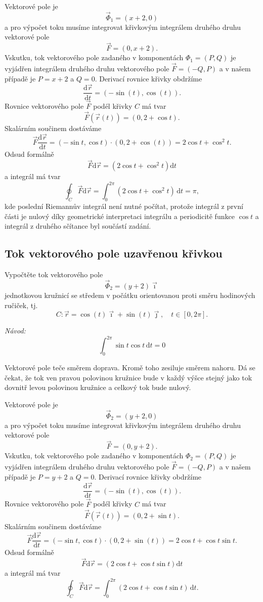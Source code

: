 Vektorové pole je $$\vec \Phi_1=(x+2,0)$$ a pro výpočet toku musíme integrovat křivkovým integrálem druhého druhu vektorové pole $$\vec F=(0,x+2).$$
Vskutku, tok vektorového pole zadaného v komponentách $\Phi_1=(P,Q)$ je vyjádřen integrálem druhého druhu vektorového pole $\vec F=(-Q,P)$ a v našem případě je $P=x+2$ a $Q=0$. Derivací rovnice křivky obdržíme
$$\frac{\mathrm d\vec r}{\mathrm dt}=(-\sin (t),\cos (t)).$$
Rovnice vektorového pole $\vec F$ podél křivky $C$ má tvar
$$\vec F(\vec r(t))=(0,2+\cos t).$$
Skalárním součinem dostáváme
$$\vec F \frac{\mathrm d\vec r}{\mathrm dt}=
(-\sin t,\cos t)\cdot (0,2+\cos (t)) = 2\cos t+\cos^2 t .
$$
Odsud formálně $$\vec F\mathrm d\vec r=(2\cos t+\cos^2 t)\mathrm dt$$
a integrál má tvar
$$\oint_C\vec F\mathrm d\vec r=\int_0^{2\pi }(2\cos t+\cos^2 t)\,\mathrm dt= \pi ,$$
kde poslední Riemannův integrál není nutné počítat, protože integrál z první části je nulový díky geometrické interpretaci integrálu a periodicitě funkce $\cos t$ a integrál z druhého sčítance byl součástí zadání.


\konec

\stranka



\subsection{Tok vektorového pole uzavřenou křivkou}

Vypočtěte tok vektorového pole $$\vec \Phi_2=(y+2)\vec\imath$$ jednotkovou kružnicí se středem v počátku orientovanou proti směru hodinových ručiček, tj. $$C\colon \vec r=\cos(t)\vec \imath+\sin(t)\vec\jmath, \quad t\in[0,2\pi].$$


\textit{Návod:} $$\int_0^{2\pi}\sin t\cos t\,\mathrm dt=0$$

\reseni
Vektorové pole teče směrem doprava. Kromě toho zesiluje směrem nahoru. Dá se čekat, že tok ven pravou polovinou kružnice bude v každý výšce stejný jako tok dovnitř levou polovinou kružnice a celkový tok bude nulový.

Vektorové pole je $$\vec \Phi_2=(y+2,0)$$ a pro výpočet toku musíme integrovat křivkovým integrálem druhého druhu vektorové pole $$\vec F=(0,y+2).$$
Vskutku, tok vektorového pole zadaného v komponentách $\Phi_2=(P,Q)$ je vyjádřen integrálem druhého druhu vektorového pole $\vec F=(-Q,P)$ a v našem případě je $P=y+2$ a $Q=0$. Derivací rovnice křivky obdržíme
$$\frac{\mathrm d\vec r}{\mathrm dt}=(-\sin (t),\cos (t)).$$
Rovnice vektorového pole $\vec F$ podél křivky $C$ má tvar
$$\vec F(\vec r(t))=(0,2+\sin t).$$
Skalárním součinem dostáváme
$$\vec F \frac{\mathrm d\vec r}{\mathrm dt}=
(-\sin t,\cos t)\cdot (0,2+\sin (t)) = 2\cos t+\cos t \sin t.
$$
Odsud formálně $$\vec F\mathrm d\vec r=(2\cos t+\cos t\sin t)\mathrm dt$$
a integrál má tvar
$$\oint_C\vec F\mathrm d\vec r=\int_0^{2\pi }(2\cos t+\cos t\sin t)\,\mathrm dt.$$

